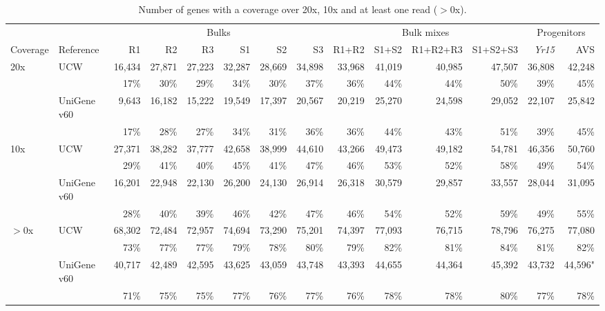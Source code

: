 \begin{sidewaystable}
\centering
\caption{Number of genes with a coverage over 20x, 10x and at least one read (\ensuremath{>}0x). }
\label{app:seqAlnCov}
\begin{localsize}{10}{11}

\begin{tabular}{llrrrrrr|rrrr|rr}
\toprule
          &             & \multicolumn{6}{c}{Bulks} & \multicolumn{4}{c}{Bulk  mixes} & \multicolumn{2}{c}{Progenitors}        \\
 Coverage & Reference   & R1     & R2     & R3     & S1     & S2     & S3     & R1+R2       & S1+S2  & R1+R2+R3 & S1+S2+S3 & \textit{Yr15}        & AVS     \\
 \midrule
 20x      & UCW         & 16,434 & 27,871 & 27,223 & 32,287 & 28,669 & 34,898 & 33,968      & 41,019 & 40,985   & 47,507   & 36,808      & 42,248  \\
          &             & 17\%    & 30\%    & 29\%    & 34\%    & 30\%    & 37\%    & 36\%         & 44\%    & 44\%      & 50\%      & 39\%         & 45\%     \\
          & UniGene v60 & 9,643  & 16,182 & 15,222 & 19,549 & 17,397 & 20,567 & 20,219      & 25,270 & 24,598   & 29,052   & 22,107      & 25,842  \\
          &             & 17\%    & 28\%    & 27\%    & 34\%    & 31\%    & 36\%    & 36\%         & 44\%    & 43\%      & 51\%      & 39\%         & 45\%     \\
 \midrule
 10x      & UCW         & 27,371 & 38,282 & 37,777 & 42,658 & 38,999 & 44,610 & 43,266      & 49,473 & 49,182   & 54,781   & 46,356      & 50,760  \\
          &             & 29\%    & 41\%    & 40\%    & 45\%    & 41\%    & 47\%    & 46\%         & 53\%    & 52\%      & 58\%      & 49\%         & 54\%     \\
          & UniGene v60 & 16,201 & 22,948 & 22,130 & 26,200 & 24,130 & 26,914 & 26,318      & 30,579 & 29,857   & 33,557   & 28,044      & 31,095  \\
          &             & 28\%    & 40\%    & 39\%    & 46\%    & 42\%    & 47\%    & 46\%         & 54\%    & 52\%      & 59\%      & 49\%         & 55\%     \\
 \midrule
 \ensuremath{>}0x      & UCW         & 68,302 & 72,484 & 72,957 & 74,694 & 73,290 & 75,201 & 74,397      & 77,093 & 76,715   & 78,796   & 76,275      & 77,080  \\
          &             & 73\%    & 77\%    & 77\%    & 79\%    & 78\%    & 80\%    & 79\%         & 82\%    & 81\%      & 84\%      & 81\%         & 82\%     \\
          & UniGene v60 & 40,717 & 42,489 & 42,595 & 43,625 & 43,059 & 43,748 & 43,393      & 44,655 & 44,364   & 45,392   & 43,732      & 44,596" \\
          &             & 71\%    & 75\%    & 75\%    & 77\%    & 76\%    & 77\%    & 76\%         & 78\%    & 78\%      & 80\%      & 77\%         & 78\%     \\
\bottomrule
\end{tabular}

\end{localsize}
\end{sidewaystable}
